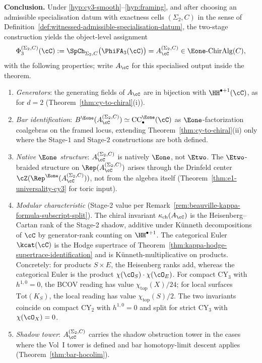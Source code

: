 \begin{theorem}[\texorpdfstring{$\Phi.3$}{Phi.3}: framed object-level \texorpdfstring{$d = 3$}{d = 3} locus]
\medskip\noindent\textbf{Conclusion.}
Under \ref{hyp:cy3-smooth}--\ref{hyp:framing}, and after choosing an admissible specialisation datum with exactness cells $(\Sigma_2,C)$ in the sense of Definition~\ref{def:witnessed-admissible-specialisation-datum}, the two-stage construction yields the object-level assignment
\[
 \Phi_3^{(\Sigma_2,C)}(\cC)
 :=
 \SpCh_{\Sigma_2,C}\bigl(\PhiFA_3(\cC)\bigr)
 =
 A_\cC^{(\Sigma_2,C)}
 \in \Eone\text{-}\mathrm{ChirAlg}(C),
\]
with the following properties; write $A_\cC$ for this specialised output inside the theorem.
\begin{enumerate}[label=\textup{(C\arabic*)}]
 \item\label{concl:generators} \emph{Generators}: the generating fields of $A_\cC$ are in bijection with $\HH^{\bullet+1}(\cC)$, as for $d = 2$ \textup{(}Theorem~\textup{\ref{thm:cy-to-chiral}(i)}\textup{)}.
 \item\label{concl:bar} \emph{Bar identification}: $B^{\Eone}(A_\cC^{(\Sigma_2,C)}) \simeq \mathrm{CC}_\bullet^{\Eone}(\cC)$ as $\Eone$-factorization coalgebras on the framed locus, extending Theorem~\textup{\ref{thm:cy-to-chiral}(ii)} only where the Stage-$1$ and Stage-$2$ constructions are both defined.
 \item\label{concl:e1} \emph{Native $\Eone$ structure}: $A_\cC^{(\Sigma_2,C)}$ is natively $\Eone$, not $\Etwo$. The $\Etwo$-braided structure on $\Rep(A_\cC^{(\Sigma_2,C)})$ arises through the Drinfeld center $\cZ(\Rep^{\Eone}(A_\cC^{(\Sigma_2,C)}))$, not from the algebra itself \textup{(}Theorem~\textup{\ref{thm:e1-universality-cy3}} for toric input\textup{)}.
 \item\label{concl:kappa} \emph{Modular characteristic} (Stage-2 value per Remark~\textup{\ref{rem:beauville-kappa-formula-subscript-split}}).
 The chiral invariant $\kappa_{\mathrm{ch}}(A_\cC)$ is the
 Heisenberg--Cartan rank of the Stage-2 shadow, additive under
 K\"unneth decompositions of $\cC$ by generator-rank counting on
 $\HH^{\bullet+1}$.
 The categorical Euler $\kcat(\cC)$ is the Hodge supertrace of
 Theorem~\textup{\ref{thm:kappa-hodge-supertrace-identification}} and is
 K\"unneth-multiplicative on products.
 Concretely: for products $S \times E$, the Heisenberg ranks add,
 whereas the categorical Euler is the product
 $\chi(\cO_S)\cdot\chi(\cO_E)$.
 For compact CY$_3$ with $h^{1,0} = 0$, the BCOV reading has value
 $\chi_{\mathrm{top}}(X)/24$; for local surfaces $\mathrm{Tot}(K_S)$,
 the local reading has value $\chi_{\mathrm{top}}(S)/2$.
 The two invariants coincide on compact CY$_2$ with $h^{1,0} = 0$ and
 split for strict CY$_3$ with $\chi(\cO_X) = 0$.
 \item\label{concl:shadow} \emph{Shadow tower}: $A_\cC^{(\Sigma_2,C)}$ carries the shadow obstruction tower in the cases where the Vol~I tower is defined and bar homotopy-limit descent applies \textup{(}Theorem~\textup{\ref{thm:bar-hocolim}}\textup{)}.
\end{enumerate}


\end{theorem}
